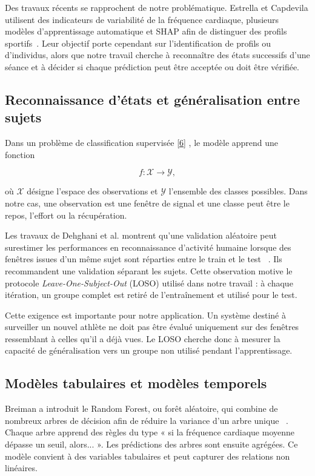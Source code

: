 \documentclass[12pt,a4paper]{article}
\newcommand{\openaccessref}[2]{%
  \nobreak\hspace{0.08em}%
  \href{#2}{\textcolor{green!35!black}{[#1]}}%
}
\begin{document}
Des travaux récents se rapprochent de notre problématique. Estrella et
Capdevila utilisent des indicateurs de variabilité de la fréquence cardiaque,
plusieurs modèles d'apprentissage automatique et SHAP afin de distinguer des
profils sportifs~\cite{estrella2025}. Leur objectif porte cependant sur
l'identification de profils ou d'individus, alors que notre travail cherche à
reconnaître des états successifs d'une séance et à décider si chaque
prédiction peut être acceptée ou doit être vérifiée.

\subsection{Reconnaissance d'états et généralisation entre sujets}

Dans un problème de classification supervisée\openaccessref{6}{https://www.deeplearningbook.org}, le modèle apprend une fonction

\begin{equation}
f:\mathcal{X}\rightarrow\mathcal{Y},
\end{equation}

où $\mathcal{X}$ désigne l'espace des observations et $\mathcal{Y}$ l'ensemble
des classes possibles. Dans notre cas, une observation est une fenêtre de
signal et une classe peut être le repos, l'effort ou la récupération.

Les travaux de Dehghani et al. montrent qu'une validation aléatoire peut
surestimer les performances en reconnaissance d'activité humaine lorsque des
fenêtres issues d'un même sujet sont réparties entre le train et le test
~\cite{dehghani2019}. Ils recommandent une validation séparant les sujets.
Cette observation motive le protocole \emph{Leave-One-Subject-Out} (LOSO)
utilisé dans notre travail : à chaque itération, un groupe complet est retiré
de l'entraînement et utilisé pour le test.

Cette exigence est importante pour notre application. Un système destiné à
surveiller un nouvel athlète ne doit pas être évalué uniquement sur des
fenêtres ressemblant à celles qu'il a déjà vues. Le LOSO cherche donc à
mesurer la capacité de généralisation vers un groupe non utilisé pendant
l'apprentissage.

\subsection{Modèles tabulaires et modèles temporels}

Breiman a introduit le Random Forest, ou forêt aléatoire, qui combine de
nombreux arbres de décision afin de réduire la variance d'un arbre unique
~\cite{breiman2001}. Chaque arbre apprend des règles du type « si la fréquence
cardiaque moyenne dépasse un seuil, alors... ». Les prédictions des arbres
sont ensuite agrégées. Ce modèle convient à des variables tabulaires et peut
capturer des relations non linéaires.
\end{document}
